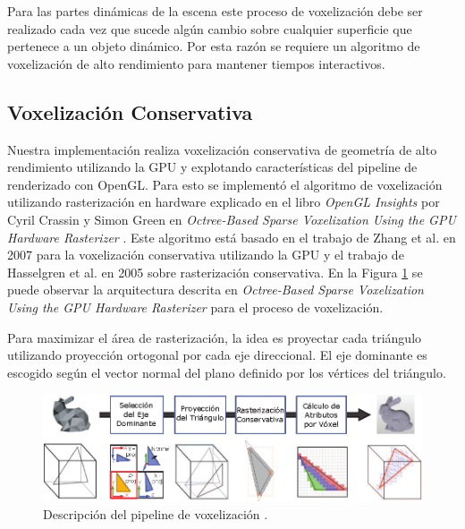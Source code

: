 Para las partes dinámicas de la escena este proceso de voxelización debe ser realizado cada vez que sucede algún cambio sobre cualquier superficie que pertenece a un objeto dinámico. Por esta razón se requiere un algoritmo de voxelización de alto rendimiento para mantener tiempos interactivos.

\subsection{Voxelización Conservativa} %
\label{sub:voxelizacion_conservativa}
Nuestra implementación realiza voxelización conservativa de geometría de alto rendimiento utilizando la \ac{GPU} y explotando características del pipeline de renderizado con OpenGL. Para esto se implementó el algoritmo de voxelización utilizando rasterización en hardware explicado en el libro \emph{OpenGL Insights} por Cyril Crassin y Simon Green en \emph{Octree-Based Sparse
Voxelization Using the GPU
Hardware Rasterizer} \cite{CozziRiccio12}. Este algoritmo está basado en el trabajo de Zhang et al. en 2007 \cite{zhang2007conservative} para la voxelización conservativa utilizando la \ac{GPU} y el trabajo de Hasselgren et al. en 2005 \cite{hasselgren2005conservative} sobre rasterización conservativa. En la Figura \ref{fig:vox_pipeline} se puede observar la arquitectura descrita en \emph{Octree-Based Sparse Voxelization Using the GPU Hardware Rasterizer} para el proceso de voxelización. 

Para maximizar el área de rasterización, la idea es proyectar cada triángulo utilizando proyección ortogonal por cada eje direccional. El eje dominante es escogido según el vector normal del plano definido por los vértices del triángulo.

\begin{figure}[H]
	\centering
	\captionsetup{justification=centering}
	\includegraphics[width=\linewidth]{media/voxelization_pipeline.eps}
	\caption{Descripción del pipeline de voxelización \cite{CozziRiccio12}.}
	\label{fig:vox_pipeline}
\end{figure}
 
